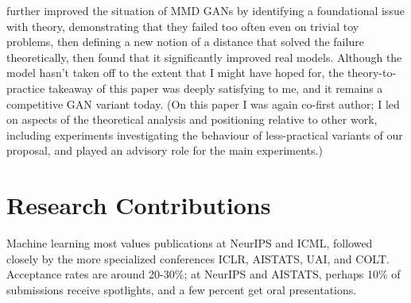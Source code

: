 \documentclass[12pt]{article}
\newcommand{\bibeqcon}{{\footnotemark[1]}}
\begin{document}
\cite{arbel:smmd} further improved the situation of MMD GANs by identifying a foundational issue with theory, demonstrating that they failed too often even on trivial toy problems, then defining a new notion of a distance that solved the failure theoretically, then found that it significantly improved real models. Although the model hasn't taken off to the extent that I might have hoped for, the theory-to-practice takeaway of this paper was deeply satisfying to me, and it remains a competitive GAN variant today. (On this paper I was again co-first author; I led on aspects of the theoretical analysis and positioning relative to other work, including experiments investigating the behaviour of less-practical variants of our proposal, and played an advisory role for the main experiments.)



\section{Research Contributions}
\renewcommand{\bibeqcon}{{\footnotemark[1]}}
\renewcommand{\thefootnote}{\fnsymbol{footnote}}  %
Machine learning most values publications at NeurIPS and ICML, followed closely by the more specialized conferences ICLR, AISTATS, UAI, and COLT. Acceptance rates are around 20-30\%; at NeurIPS and AISTATS, perhaps 10\% of submissions receive spotlights, and a few percent get oral presentations.
\end{document}
